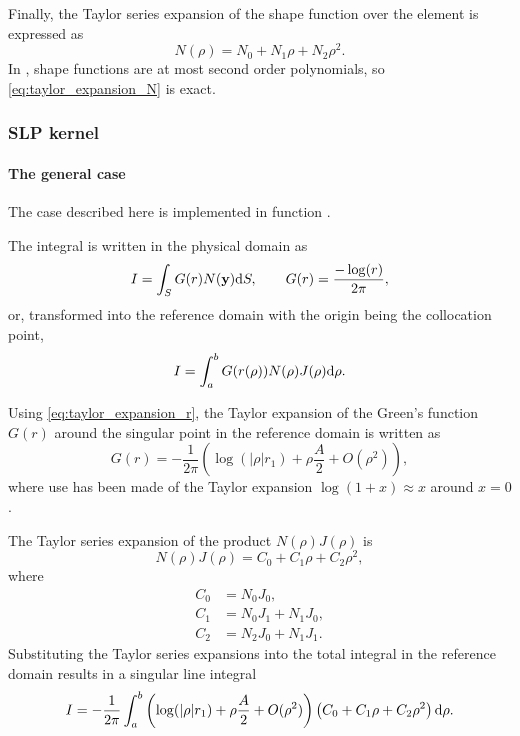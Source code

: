 Finally, the Taylor series expansion of the shape function over the element is expressed as
%
\begin{equation}
	N(\rho) = N_0 + N_1 \rho + N_2 \rho^2
	.
	\label{eq:taylor_expansion_N}
\end{equation}
%
In \NiHu{}, shape functions are at most second order polynomials, so \eqref{eq:taylor_expansion_N} is exact.


\subsubsection{SLP kernel}

\paragraph{The general case}

The case described here is implemented in function .

The integral is written in the physical domain as
%
\begin{equation}
	I = \int_S G(r) N({\bf y}) \mathrm{d} S, \qquad G(r) = \frac{-\log(r)}{2\pi}
	,
\end{equation}
%
or, transformed into the reference domain with the origin being the collocation point,
%
\begin{equation}
	I = \int_a^b G(r(\rho)) N(\rho) J(\rho) \mathrm{d} \rho
	.
\end{equation}

Using \eqref{eq:taylor_expansion_r}, the Taylor expansion of the Green's function $G(r)$ around the singular point in the reference domain is written as
%
\begin{equation}
	G(r) = -\frac{1}{2\pi} \left(
		\log (|\rho| r_1) + \rho \frac{A}{2} + O(\rho^2)
		\right)
	,
\end{equation}
%
where use has been made of the Taylor expansion $\log(1+x) \approx x$ around $x=0$.

The Taylor series expansion of the product $N(\rho) J(\rho)$ is
%
\begin{equation}
	N(\rho) J(\rho) = C_0 + C_1 \rho + C_2 \rho^2
	,
\end{equation}
%
where
%
\begin{align}
	C_0 &= N_0 J_0, \\
	C_1 &= N_0 J_1 + N_1 J_0, \\
	C_2 &= N_2 J_0 + N_1 J_1.
\end{align}
%
Substituting the Taylor series expansions into the total integral in the reference domain results in a singular line integral
%
\begin{equation}
	I = -\frac{1}{2\pi} \int_{a}^{b}
	 \left(
		\log (|\rho| r_1) + \rho \frac{A}{2} + O(\rho^2)
	\right)
	\left( C_0 + C_1 \rho + C_2 \rho^2 \right) \mathrm{d}\rho
	.
\end{equation}

